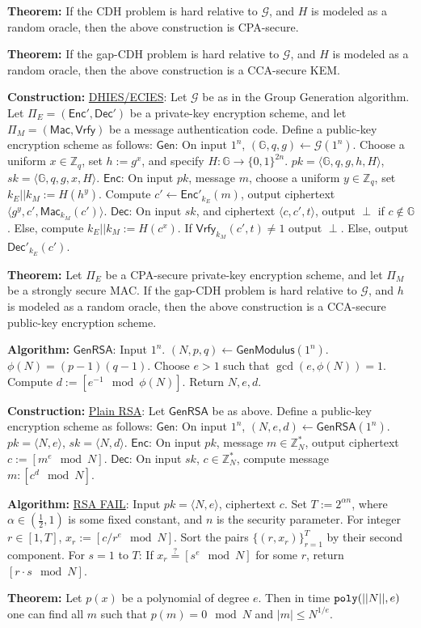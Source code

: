 \documentclass[10pt]{article}
\newcommand{\Z}{\mathbb{Z}}
\newcommand{\G}{\mathbb{G}}
\newcommand{\GGG}{\mathcal{G}}
\newcommand{\thm}[1]{{\bf Theorem:} \underline{#1}}
\newcommand{\con}[1]{{\bf Construction:} \underline{#1}}
\newcommand{\alg}[1]{{\bf Algorithm:} \underline{#1}}
\newcommand{\Enc}{\mathsf{Enc}}
\newcommand{\Dec}{\mathsf{Dec}}
\newcommand{\Mac}{\mathsf{Mac}}
\newcommand{\Vrfy}{\mathsf{Vrfy}}
\newcommand{\Gen}{\mathsf{Gen}}
\newcommand{\GenM}{\mathsf{GenModulus}}
\newcommand{\GenRSA}{\mathsf{GenRSA}}
\newcommand{\ang}[1]{\langle#1\rangle}
\newcommand{\poly}{{\tt poly}}
\newcommand{\from}{\leftarrow}
\begin{document}
\begin{multicols}{3}
\thm{}If the CDH problem is hard relative to $\GGG$, and $H$ is modeled as a random oracle, then the above construction is CPA-secure.

\thm{}If the gap-CDH problem is hard relative to $\GGG$, and $H$ is modeled as a random oracle, then the above construction is a CCA-secure KEM.

\con{DHIES/ECIES}: Let $\GGG$ be as in the Group Generation algorithm. Let $\Pi_E=(\Enc',\Dec')$ be a private-key encryption scheme, and let $\Pi_M=(\Mac,\Vrfy)$ be a message authentication code. Define a public-key encryption scheme as follows: $\Gen$: On input $1^n$, $(\G,q,g)\from\GGG(1^n)$. Choose a uniform $x\in\Z_q$, set $h:=g^x$, and specify $H:\G\to\{0,1\}^{2n}$. $pk=\ang{\G,q,g,h,H}$, $sk=\ang{\G,q,g,x,H}$. $\Enc$: On input $pk$, message $m$, choose a uniform $y\in\Z_q$, set $k_E||k_M:=H(h^y)$. Compute $c'\from\Enc'_{k_E}(m)$, output ciphertext $\ang{g^y,c',\Mac_{k_M}(c')}$. $\Dec$: On input $sk$, and ciphertext $\ang{c,c',t}$, output $\perp$ if $c\not\in\G$. Else, compute $k_E||k_M:=H(c^x)$. If $\Vrfy_{k_M}(c',t)\neq1$ output $\perp$. Else, output $\Dec'_{k_E}(c')$.

\thm{}Let $\Pi_E$ be a CPA-secure private-key encryption scheme, and let $\Pi_M$ be a strongly secure MAC. If the gap-CDH problem is hard relative to $\GGG$, and $h$ is modeled as a random oracle, then the above construction is a CCA-secure public-key encryption scheme.

\alg{$\GenRSA$}: Input $1^n$. $(N,p,q)\from\GenM(1^n)$. $\phi(N)=(p-1)(q-1)$. Choose $e>1$ such that $\gcd(e,\phi(N))=1$. Compute $d:=[e^{-1}\mod{\phi(N)}]$. Return $N,e,d$.

\con{Plain RSA}: Let $\GenRSA$ be as above. Define a public-key encryption scheme as follows: $\Gen$: On input $1^n$, $(N,e,d)\from\GenRSA(1^n)$. $pk=\ang{N,e}$, $sk=\ang{N,d}$. $\Enc$: On input $pk$, message $m\in\Z_N^*$, output ciphertext $c:=[m^e\mod{N}]$. $\Dec$: On input $sk$, $c\in\Z_N^*$, compute message $m:[c^d\mod{N}]$.

\alg{RSA FAIL}: Input $pk=\ang{N,e}$, ciphertext $c$. Set $T:=2^{\alpha n}$, where $\alpha\in(\frac{1}{2},1)$ is some fixed constant, and $n$ is the security parameter. For integer $r\in[1,T]$, $x_r:=[c/r^e\mod{N}]$. Sort the pairs $\{(r,x_r)\}^T_{r=1}$ by their second component. For $s=1$ to $T$: If $x_r\overset{?}{=}[s^e\mod{N}]$ for some $r$, return $[r\cdot s\mod{N}]$.

\thm{}Let $p(x)$ be a polynomial of degree $e$. Then in time $\poly(||N||,e)$ one can find all $m$ such that $p(m)=0\mod{N}$ and $|m|\leq N^{1/e}$.


\end{multicols}
\end{document}
